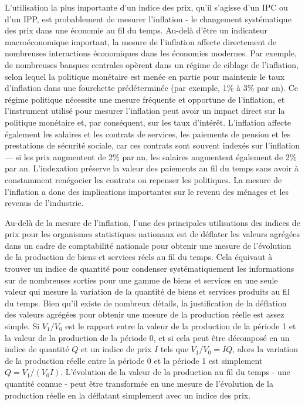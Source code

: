 \documentclass[
]{article}
\begin{document}
L'utilisation la plus importante d'un indice des prix, qu'il s'agisse d'un IPC ou d'un IPP, est probablement de mesurer l'inflation - le changement systématique des prix dans une économie au fil du temps. Au-delà d'être un indicateur macroéconomique important, la mesure de l'inflation affecte directement de nombreuses interactions économiques dans les économies modernes. Par exemple, de nombreuses banques centrales opèrent dans un régime de ciblage de l'inflation, selon lequel la politique monétaire est menée en partie pour maintenir le taux d'inflation dans une fourchette prédéterminée (par exemple, 1\% à 3\% par an). Ce régime politique nécessite une mesure fréquente et opportune de l'inflation, et l'instrument utilisé pour mesurer l'inflation peut avoir un impact direct sur la politique monétaire et, par conséquent, sur les taux d'intérêt. L'inflation affecte également les salaires et les contrats de services, les paiements de pension et les prestations de sécurité sociale, car ces contrats sont souvent indexés sur l'inflation --- si les prix augmentent de 2\% par an, les salaires augmentent également de 2\% par an. L'indexation préserve la valeur des paiements au fil du temps sans avoir à constamment renégocier les contrats ou repenser les politiques. La mesure de l'inflation a donc des implications importantes sur le revenu des ménages et les revenus de l'industrie.

Au-delà de la mesure de l'inflation, l'une des principales utilisations des indices de prix pour les organismes statistiques nationaux est de déflater les valeurs agrégées dans un cadre de comptabilité nationale pour obtenir une mesure de l'évolution de la production de biens et services réels au fil du temps. Cela équivaut à trouver un indice de quantité pour condenser systématiquement les informations sur de nombreuses sorties pour une gamme de biens et services en une seule valeur qui mesure la variation de la quantité de biens et services produits au fil du temps. Bien qu'il existe de nombreux détails, la justification de la déflation des valeurs agrégées pour obtenir une mesure de la production réelle est assez simple. Si \(V_1 / V_0\) est le rapport entre la valeur de la production de la période 1 et la valeur de la production de la période 0, et si cela peut être décomposé en un indice de quantité \(Q\) et un indice de prix \(I\) tels que \(V_1 / V_0 = IQ\), alors la variation de la production réelle entre la période 0 et la période 1 est simplement \(Q = V_1 / (V_0 I)\). L'évolution de la valeur de la production au fil du temps - une quantité connue - peut être transformée en une mesure de l'évolution de la production réelle en la déflatant simplement avec un indice des prix.
\end{document}
